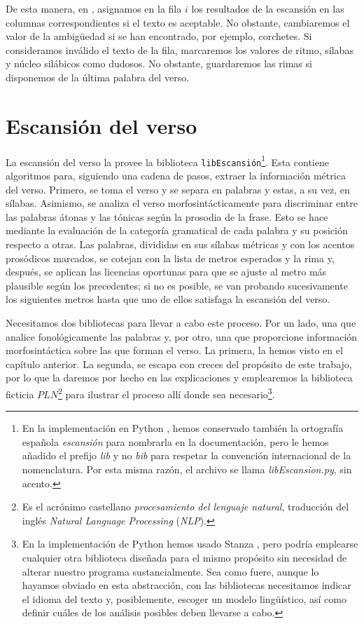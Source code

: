  De esta manera, en , asignamos en la fila $i$ los resultados de la escansión en las columnas correspondientes si el texto es aceptable. No obstante, cambiaremos el valor de la ambigüedad si se han encontrado, por ejemplo, corchetes. Si consideramos inválido el texto de la fila, marcaremos los valores de ritmo, sílabas y núcleo silábicos como dudosos. No obstante, guardaremos las rimas si disponemos de la última palabra del verso.

\section{Escansión del verso}\label{sec:libescansion}
La escansión del verso la provee la biblioteca \texttt{libEscansión}\footnote{En la implementación en Python \parencite{sanz2023sd}, hemos conservado también la ortografía española \textit{escansión} para nombrarla en la documentación, pero le hemos añadido el prefijo \textit{lib} y no \textit{bib} para respetar la convención internacional de la nomenclatura. Por esta misma razón, el archivo se llama \textit{libEscansion.py}, sin acento.}. Esta contiene algoritmos para, siguiendo una cadena de pasos, extraer la información métrica del verso. Primero, se toma el verso y se separa en palabras y estas, a su vez, en sílabas. Asimismo, se analiza el verso morfosintácticamente para discriminar entre las palabras átonas y las tónicas según la prosodia de la frase. Esto se hace mediante la evaluación de la categoría gramatical de cada palabra y su posición respecto a otras. Las palabras, divididas en sus sílabas métricas y con los acentos prosódicos marcados, se cotejan con la lista de metros esperados y la rima y, después, se aplican las licencias oportunas para que se ajuste al metro más plausible según los precedentes; si no es posible, se van probando sucesivamente los siguientes metros hasta que uno de ellos satisfaga la escansión del verso.

Necesitamos dos bibliotecas para llevar a cabo este proceso. Por un lado, una que analice fonológicamente las palabras y, por otro, una que proporcione información morfosintáctica sobre las que forman el verso. La primera, la hemos visto en el capítulo anterior. La segunda, se escapa con creces del propósito de este trabajo, por lo que la daremos por hecho en las explicaciones y emplearemos la biblioteca ficticia $PLN$\footnote{Es el acrónimo castellano \textit{procesamiento del lenguaje natural}, traducción del inglés \textit{Natural Language Processing} (\textit{NLP}).} para ilustrar el proceso allí donde sea necesario\footnote{En la implementación de Python hemos usado Stanza \parencite{qi2020}, pero podría emplearse cualquier otra biblioteca diseñada para el mismo propósito sin necesidad de alterar nuestro programa sustancialmente. Sea como fuere, aunque lo hayamos obviado en esta abstracción, con las bibliotecas necesitamos indicar el idioma del texto y, posiblemente, escoger un modelo lingüístico, así como definir cuáles de los análisis posibles deben llevarse a cabo.}.

